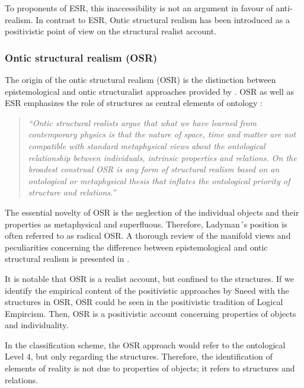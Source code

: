 \documentclass{article}
\begin{document}
To proponents of ESR, this inaccessibility is not an argument in favour of anti-realism. In contrast to ESR, Ontic structural realism has been introduced as a positivistic point of view on the structural realist account.

\subsubsection{Ontic structural realism (OSR) }

The origin of the ontic structural realism (OSR) is the distinction between epistemological and ontic structuralist approaches provided by \cite[]{Ladyman1998409}. OSR as well as ESR emphasizes the role of structures as central elements of ontology \cite[]{sep-structural-realism}: 

\begin{quote}
\textit{``Ontic structural realists argue that what we have learned from contemporary physics is that the nature of space, time and matter are not compatible with standard metaphysical views about the ontological relationship between individuals, intrinsic properties and relations. On the broadest construal OSR is any form of structural realism based on an ontological or metaphysical thesis that inflates the ontological priority of structure and relations.''}
\end{quote}

The essential novelty of OSR is the neglection of the individual objects and their properties as metaphysical and superfluous. Therefore, Ladyman´s position is often referred to as radical OSR. A thorough review of the manifold views and peculiarities concerning the difference between epistemological and ontic structural realism is presented in \cite[]{sep-structural-realism}. \newline

It is notable that OSR is a realist account, but confined to the structures. If we identify the empirical content of the positivistic approaches by Sneed with the structures in OSR, OSR could be seen in the positivistic tradition of Logical Empircism. Then, OSR is a positivistic account concerning properties of objects and individuality. \newline 

In the classification scheme, the OSR approach would refer to the ontological Level 4, but only regarding the structures. Therefore, the identification of elements of reality is not due to properties of objects; it refers to structures and relations.  
\end{document}
